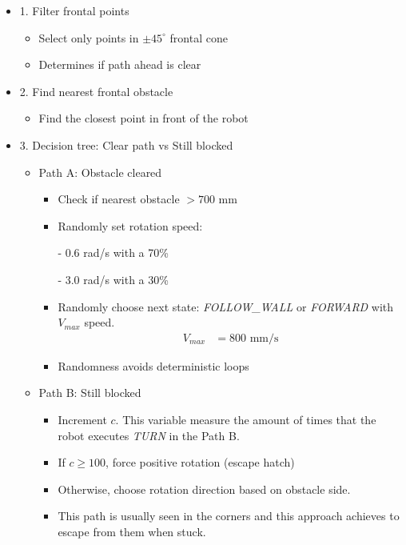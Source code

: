 \documentclass[conference]{IEEEtran}
\begin{document}
\begin{itemize}
    \item 1. Filter frontal points
        \begin{itemize}
            \item Select only points in $\pm 45^\circ$ frontal cone
            \item Determines if path ahead is clear
        \end{itemize}
    \item 2. Find nearest frontal obstacle
        \begin{itemize}
            \item Find the closest point in front of the robot
        \end{itemize}
    \item 3. Decision tree: Clear path vs Still blocked
        \begin{itemize}
            \item Path A: Obstacle cleared
                \begin{itemize}
                    \item Check if nearest obstacle $> 700$ mm
                    \item Randomly set rotation speed:
                    
                    - 0.6 rad/s with a 70\%
                    
                    - 3.0 rad/s with a 30\%
                    
                    \item Randomly choose next state: \textit{FOLLOW\_WALL} or \textit{FORWARD} with $V_{max}$ speed.
                    \begin{align}
                        V_{max} &= 800 \text{ mm/s} \label{eq:max_adv}
                    \end{align}
                    \item Randomness avoids deterministic loops
                \end{itemize}
            \item Path B: Still blocked
                \begin{itemize}
                    \item Increment $c$. This variable measure the amount of times that the robot executes \textit{TURN} in the Path B.
                    \item If $c \ge 100$, force positive rotation (escape hatch)
                    \item Otherwise, choose rotation direction based on obstacle side.
                    \item This path is usually seen in the corners and this approach achieves to escape from them when stuck.
                \end{itemize}
        \end{itemize}
\end{itemize}
\end{document}

